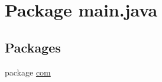 \hypertarget{namespacemain_1_1java}{}\section{Package main.\+java}
\label{namespacemain_1_1java}
\subsection*{Packages}
\begin{DoxyCompactItemize}
\item 
package \hyperlink{namespacemain_1_1java_1_1com}{com}
\end{DoxyCompactItemize}

